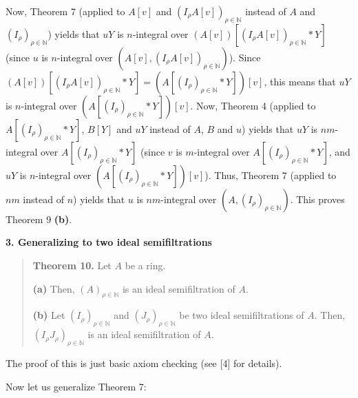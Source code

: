 \documentclass[12pt,final,notitlepage,onecolumn]{article}%
\begin{document}
Now, Theorem 7 (applied to $A\left[  v\right]  $ and $\left(  I_{\rho}A\left[
v\right]  \right)  _{\rho\in\mathbb{N}}$ instead of $A$ and $\left(  I_{\rho
}\right)  _{\rho\in\mathbb{N}}$) yields that $uY$ is $n$-integral over
$\left(  A\left[  v\right]  \right)  \left[  \left(  I_{\rho}A\left[
v\right]  \right)  _{\rho\in\mathbb{N}}\ast Y\right]  $ (since $u$ is
$n$-integral over $\left(  A\left[  v\right]  ,\left(  I_{\rho}A\left[
v\right]  \right)  _{\rho\in\mathbb{N}}\right)  $). Since $\left(  A\left[
v\right]  \right)  \left[  \left(  I_{\rho}A\left[  v\right]  \right)
_{\rho\in\mathbb{N}}\ast Y\right]  =\left(  A\left[  \left(  I_{\rho}\right)
_{\rho\in\mathbb{N}}\ast Y\right]  \right)  \left[  v\right]  $, this means
that $uY$ is $n$-integral over $\left(  A\left[  \left(  I_{\rho}\right)
_{\rho\in\mathbb{N}}\ast Y\right]  \right)  \left[  v\right]  $. Now, Theorem
4 (applied to $A\left[  \left(  I_{\rho}\right)  _{\rho\in\mathbb{N}}\ast
Y\right]  $, $B\left[  Y\right]  $ and $uY$ instead of $A$, $B$ and $u$)
yields that $uY$ is $nm$-integral over $A\left[  \left(  I_{\rho}\right)
_{\rho\in\mathbb{N}}\ast Y\right]  $ (since $v$ is $m$-integral over $A\left[
\left(  I_{\rho}\right)  _{\rho\in\mathbb{N}}\ast Y\right]  $, and $uY$ is
$n$-integral over $\left(  A\left[  \left(  I_{\rho}\right)  _{\rho
\in\mathbb{N}}\ast Y\right]  \right)  \left[  v\right]  $). Thus, Theorem 7
(applied to $nm$ instead of $n$) yields that $u$ is $nm$-integral over
$\left(  A,\left(  I_{\rho}\right)  _{\rho\in\mathbb{N}}\right)  $. This
proves Theorem 9 \textbf{(b)}.

\begin{center}
\color{blue} \textbf{3. Generalizing to two ideal semifiltrations} \color{black}
\end{center}

\begin{quote}
\textbf{Theorem 10.} Let $A$ be a ring.

\textbf{(a)} Then, $\left(  A\right)  _{\rho\in\mathbb{N}}$ is an ideal
semifiltration of $A$.

\textbf{(b)} Let $\left(  I_{\rho}\right)  _{\rho\in\mathbb{N}}$ and $\left(
J_{\rho}\right)  _{\rho\in\mathbb{N}}$ be two ideal semifiltrations of $A$.
Then, $\left(  I_{\rho}J_{\rho}\right)  _{\rho\in\mathbb{N}}$ is an ideal
semifiltration of $A$.
\end{quote}

The proof of this is just basic axiom checking (see [4] for details).

Now let us generalize Theorem 7:
\end{document}
